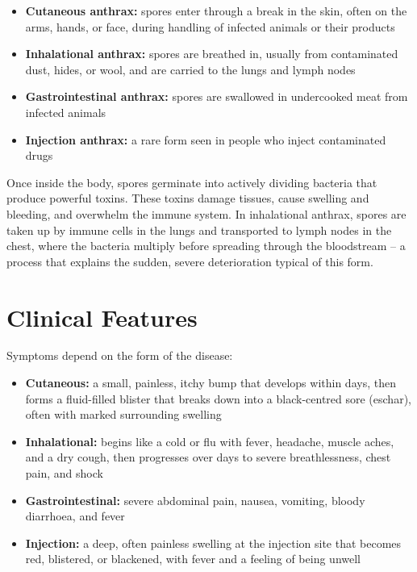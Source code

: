 \begin{itemize}
    \item \textbf{Cutaneous anthrax:} spores enter through a break in the skin, often on the arms, hands, or face, during handling of infected animals or their products
    \item \textbf{Inhalational anthrax:} spores are breathed in, usually from contaminated dust, hides, or wool, and are carried to the lungs and lymph nodes
    \item \textbf{Gastrointestinal anthrax:} spores are swallowed in undercooked meat from infected animals
    \item \textbf{Injection anthrax:} a rare form seen in people who inject contaminated drugs
\end{itemize}

Once inside the body, spores germinate into actively dividing bacteria that produce powerful toxins. These toxins damage tissues, cause swelling and bleeding, and overwhelm the immune system. In inhalational anthrax, spores are taken up by immune cells in the lungs and transported to lymph nodes in the chest, where the bacteria multiply before spreading through the bloodstream -- a process that explains the sudden, severe deterioration typical of this form.

\section*{Clinical Features}
Symptoms depend on the form of the disease:

\begin{itemize}
    \item \textbf{Cutaneous:} a small, painless, itchy bump that develops within days, then forms a fluid-filled blister that breaks down into a black-centred sore (eschar), often with marked surrounding swelling
    \item \textbf{Inhalational:} begins like a cold or flu with fever, headache, muscle aches, and a dry cough, then progresses over days to severe breathlessness, chest pain, and shock
    \item \textbf{Gastrointestinal:} severe abdominal pain, nausea, vomiting, bloody diarrhoea, and fever
    \item \textbf{Injection:} a deep, often painless swelling at the injection site that becomes red, blistered, or blackened, with fever and a feeling of being unwell
\end{itemize}

